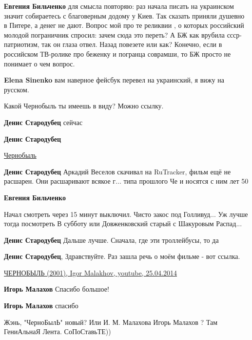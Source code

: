 \begin{itemize}
\begin{itemize}
\textbf{Евгения Бильченко} для смысла повторяю: раз начала писать на украинском значит собираетесь с благоверным додому у Киев. Так сказать приняли душевно в Питере, а денег не дают. Вопрос мой про те реликвии , о которых российский молодой пограничник спросил: зачем сюда это переть? А БЖ как врубила ссср-патриотизм, так он глаза отвел. Назад повезете или как? Конечно, если в российском ТВ-ролике про беженку и погранца соврамши, то БЖ просто не понимает о чем вопрос.

\textbf{Elena Sinenko} вам наверное фейсбук перевел на украинский, я вижу на русском.
\end{itemize} %


Какой Чернобыль ты имеешь в виду? Можно ссылку.

\begin{itemize} %
\textbf{Денис Стародубец} сейчас

\textbf{Денис Стародубец} 

\href{https://youtu.be/BpoFAhTG-9Q}{%
Чернобыль%
}

\textbf{Денис Стародубец} Аркадий Веселов скачивал на RuTracker, фильм ещё не расшарен. Они расшаривают всякое г... типа прошлого Че и носятся с ним лет 50

\textbf{Евгения Бильченко} 

Начал смотреть через 15 минут выключил. Чисто закос под Голливуд... Уж лучше
тогда посмотреть В субботу или Довженковский старый с Шакуровым Распад...

\textbf{Денис Стародубец} Дальше лучше. Сначала, где эти троллейбусы, то да

\textbf{Денис Стародубец}, Здравствуйте. Раз зашла речь о моём фильме - вот ссылка.

\href{https://www.youtube.com/watch?v=jpb3pdpXZno&t=122s}{%
ЧЕРНОБЫЛЬ (2001), Igor Malakhov, youtube, 25.04.2014%
}

\textbf{Игорь Малахов} Спасибо большое!


\textbf{Игорь Малахов} спасибо

\end{itemize} %


Жэнь, "ЧерноБылЬ" новый? Или И. М. Малахова Игорь Малахов ? Там ГениАльнаЯ Лента. СоПоСтавьТЕ))


\end{itemize}
